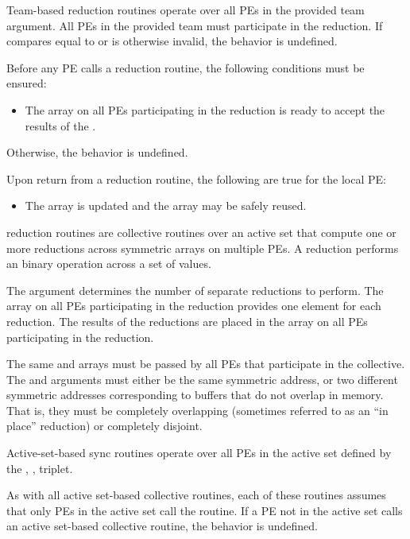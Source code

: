 \begin{apidefinition}
{    Team-based reduction routines operate over all \acp{PE} in the provided team argument. All
    \acp{PE} in the provided team must participate in the reduction.
    If  compares equal to  or is
    otherwise invalid, the behavior is undefined.

    Before any \ac{PE} calls a reduction routine, the following conditions must be ensured:
    \begin{itemize}
    \item The \dest{} array on all \acp{PE} participating in the reduction
      is ready to accept the results of the .
    \end{itemize}
    Otherwise, the behavior is undefined.
    
    Upon return from a reduction routine, the following are true for the local
    \ac{PE}:
    \begin{itemize}
    \item The \dest{} array is updated and the \source{} array may be safely reused.
    \end{itemize}

\begin{DeprecateBlock}
    \openshmem reduction routines are collective routines over an active set 
	that compute one or more reductions across symmetric
    arrays on multiple \acp{PE}.  A reduction performs an binary operation
    across a set of values.

    The  argument determines the number of separate reductions to
    perform.  The \source{} array on all \acp{PE} participating in the reduction
    provides one element for each reduction.  The results of the reductions are placed in the
    \dest{} array on all \acp{PE} participating in the reduction.

    The same \source{} and \dest{} arrays must be passed by all PEs that
    participate in the collective.
    The \source{} and \dest{} arguments must either be the same symmetric
    address, or two different symmetric addresses corresponding to buffers that
    do not overlap in memory. That is, they must be completely overlapping (sometimes referred to as an ``in place'' reduction) or
    completely disjoint.

    Active-set-based sync routines operate over all \acp{PE} in the active set
    defined by the , ,  triplet.

    As with all active set-based collective routines,
    each of these routines assumes
    that only \acp{PE} in the active set call the routine.  If a \ac{PE} not in
    the active set calls an active set-based collective routine,
    the behavior is undefined.


\end{DeprecateBlock}}
\end{apidefinition}

